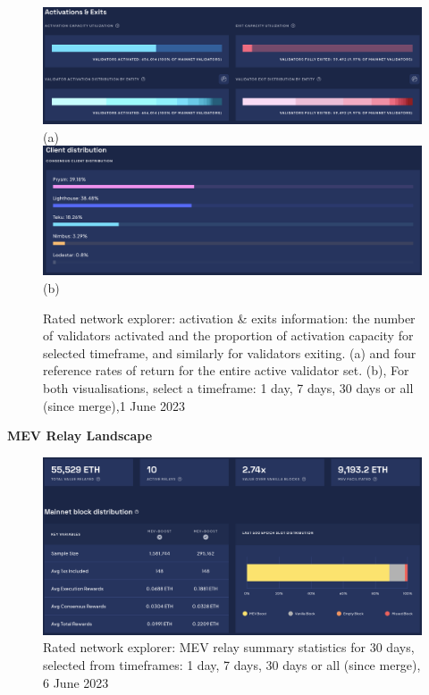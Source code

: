 \documentclass[UTF8]{article}
\begin{document}
{\begin{figure}[htbp]
\begin{center}
\includegraphics[width=\linewidth]{images/ratednw3}\\
(a)
\includegraphics[width=\linewidth]{images/ratednw4}\\
(b)
\caption{Rated network explorer: activation \& exits information: the number of validators activated and the proportion of activation capacity for selected timeframe, and similarly for validators exiting.  (a) and four reference rates of return for the entire active validator set. (b), For both visualisations, select a timeframe: 1 day, 7 days, 30 days or all (since merge),1 June 2023}
\label{fig:ratednw4}
\end{center}
\end{figure}

\clearpage
\textbf{MEV Relay Landscape}\\
\begin{figure}[htbp]
\begin{center}
\includegraphics[width=\linewidth]{images/ratedrelay1}
\caption{Rated network explorer: MEV relay summary statistics for 30 days, selected from timeframes: 1 day, 7 days, 30 days or all (since merge), 6 June 2023}
\label{fig:ratedrelay1}
\end{center}
\end{figure}

}
\end{document}
